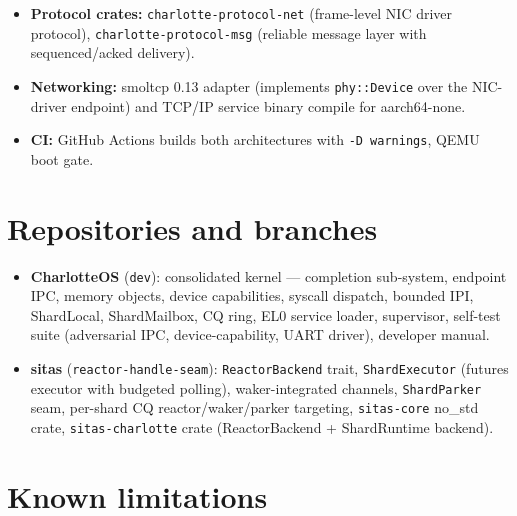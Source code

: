 \begin{itemize}
        aarch64-unknown-none. sitas-charlotte (ReactorBackend + ShardRuntime)
        links against the kernel's syscall ABI. Per-shard CQ rings are mapped
        by the loader contract. ShardParker seam (CQ\_WAIT/CQ\_WAKE) retires
        busy-waiting; ShardExecutor implements budgeted polling with task
        wakeup from drained events.
    \item \textbf{Protocol crates:} \texttt{charlotte-protocol-net}
        (frame-level NIC driver protocol), \texttt{charlotte-protocol-msg}
        (reliable message layer with sequenced/acked delivery).
    \item \textbf{Networking:} smoltcp 0.13 adapter (implements
        \texttt{phy::Device} over the NIC-driver endpoint) and TCP/IP service
        binary compile for aarch64-none.
    \item \textbf{CI:} GitHub Actions builds both architectures with
        \texttt{-D warnings}, QEMU boot gate.
\end{itemize}

\section{Repositories and branches}

\begin{itemize}
    \item \textbf{CharlotteOS} (\texttt{dev}): consolidated kernel ---
        completion sub-system, endpoint IPC, memory objects, device
        capabilities, syscall dispatch, bounded IPI, ShardLocal, ShardMailbox,
        CQ ring, EL0 service loader, supervisor, self-test suite (adversarial
        IPC, device-capability, UART driver), developer manual.
    \item \textbf{sitas} (\texttt{reactor-handle-seam}): \texttt{ReactorBackend}
        trait, \texttt{ShardExecutor} (futures executor with budgeted polling),
        waker-integrated channels, \texttt{ShardParker} seam, per-shard CQ
        reactor/waker/parker targeting, \texttt{sitas-core} no\_std crate,
        \texttt{sitas-charlotte} crate (ReactorBackend + ShardRuntime backend).
\end{itemize}

\section{Known limitations}

